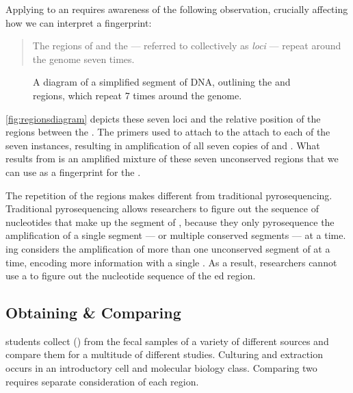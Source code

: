 Applying \pcr{} to an \ecoli{} \isol{} requires awareness of the following observation, crucially affecting how we can interpret a fingerprint:

\begin{quote}
The \itsshort{} regions of \ecoli{} and the \rrna{} --- referred to collectively as \textit{loci} --- repeat around the \ecoli{} genome seven times.
\end{quote}

\begin{figure}
    \centering
    
    \caption{A diagram of a simplified segment of \ecoli{} DNA, outlining the \Ssixt{} and \Sfive{} \itsshort{} regions, which repeat 7 times around the \ecoli{} genome.}
    \label{fig:regionsdiagram}
\end{figure}
\autoref{fig:regionsdiagram} depicts these seven loci and the relative position of the \itsshort{} regions between the \rrna{}.
The primers used to attach to the \rrna{} attach to each of the seven instances, resulting in \pcr{} amplification of all seven copies of \Ssixt{} and \Sfive{}.
What results from \pcr{} is an amplified mixture of these seven unconserved \itsshort{} regions that we can use as a fingerprint for the \isol{}.


The repetition of the \itsshort{} regions makes \pyros{} different from traditional pyrosequencing.
Traditional pyrosequencing allows researchers to figure out the sequence of nucleotides that make up the segment of \dna{}, because they only pyrosequence the \pcr{} amplification of a single segment --- or multiple conserved segments --- at a time.
\Pyro{}ing considers the \pcr{} amplification of more than one unconserved segment of \dna{} at a time, encoding more information with a single \pyro{}.
As a result, \cplop{} researchers cannot use a \pyro{} to figure out the nucleotide sequence of the \pyro{}ed \itsshort{} region.

\subsection{Obtaining \& Comparing \ecolilong{} \Isols{}}\label{sec:background:isolates}
\cp{} students collect \ecolilong{} (\ecoli{}) \isols{} from the fecal samples of a variety of different sources and compare them for a multitude of different studies.
Culturing and \ecoli{} extraction occurs in an introductory cell and molecular biology class.
Comparing two \isols{} requires separate consideration of each \itsshort{} region.

